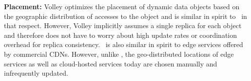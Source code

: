 \textbf{Placement:} %
Volley \cite{volley} optimizes the placement of dynamic data objects based on the geographic distribution of accesses to the object and is similar in spirit to \auspice\ in that respect. However, Volley implicitly assumes a single replica for each object and therefore does not have to worry about high update rates or coordination overhead for replica consistency. %
\auspice\ is also similar in spirit to edge services offered by commercial CDNs. However, unlike \auspice, the geo-distributed locations of edge services as well as cloud-hosted services today are chosen manually and infrequently updated. %





